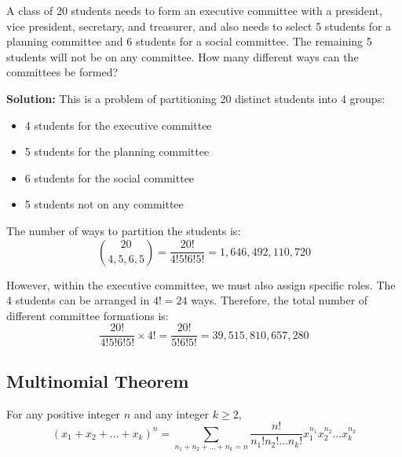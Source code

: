 \begin{examplebox}[title=Example: Committee Formation]
    A class of 20 students needs to form an executive committee with a president, vice president, secretary, and treasurer, and also needs to select 5 students for a planning committee and 6 students for a social committee. The remaining 5 students will not be on any committee. How many different ways can the committees be formed?
    
    \textbf{Solution:} This is a problem of partitioning 20 distinct students into 4 groups:
    \begin{itemize}
        \item 4 students for the executive committee
        \item 5 students for the planning committee
        \item 6 students for the social committee
        \item 5 students not on any committee
    \end{itemize}
    
    The number of ways to partition the students is:
    \[
    \binom{20}{4, 5, 6, 5} = \frac{20!}{4!5!6!5!} = 1,646,492,110,720
    \]
    
    However, within the executive committee, we must also assign specific roles. The 4 students can be arranged in $4! = 24$ ways. Therefore, the total number of different committee formations is:
    \[
    \frac{20!}{4!5!6!5!} \times 4! = \frac{20!}{5!6!5!} = 39,515,810,657,280
    \]
\end{examplebox}





\subsection{Multinomial Theorem}
\begin{theorembox}[title=Multinomial Theorem]
    For any positive integer \(n\) and any integer \(k \geq 2\),
    \[
    (x_1 + x_2 + \ldots + x_k)^n = \sum_{n_1+n_2+\ldots+n_k=n} \frac{n!}{n_1! n_2! \ldots n_k!} x_1^{n_1} x_2^{n_2} \ldots x_k^{n_k}
    \]
\end{theorembox}




